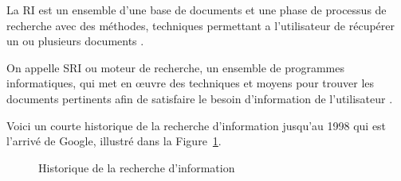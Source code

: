 \begin{definition}
    La RI est un ensemble d'une base de documents et une phase de processus de recherche avec des méthodes, techniques permettant a l'utilisateur de récupérer un ou plusieurs documents \citep{ri-sur-le-web}.
\end{definition}

\begin{definition}
    On appelle SRI ou moteur de recherche, un ensemble de programmes informatiques, qui met en œuvre des techniques et moyens pour trouver les documents pertinents afin de satisfaire le besoin d'information de l'utilisateur \citep{approche-semantique}.
\end{definition}

Voici un courte historique de la recherche d'information jusqu'au 1998 qui est l'arrivé de Google, illustré dans la Figure~\ref{fig:ir-history}.

\begin{figure}[htbp]
    \begin{center}
    \end{center}
    \caption{Historique de la recherche d'information \citep{ir-course}}
    \label{fig:ir-history}
\end{figure}

